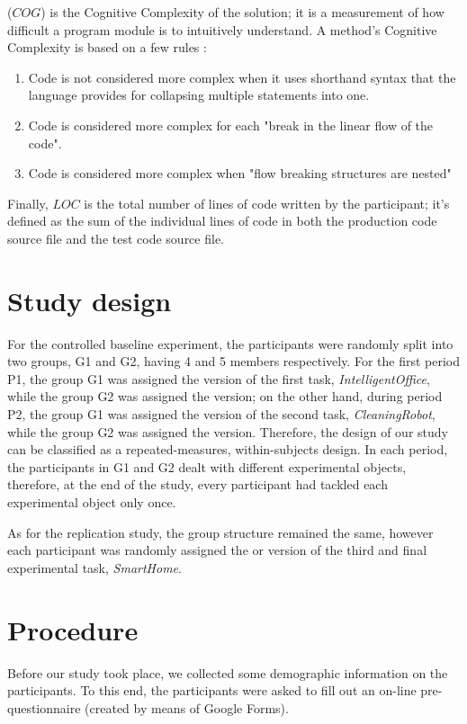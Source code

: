(\textbf{$COG$}) is the Cognitive Complexity of the solution; it is a measurement of how difficult a program module is to intuitively understand. A method's Cognitive Complexity is based on a few rules \cite{CognitiveComplexity}:
\begin{enumerate}
    \item Code is not considered more complex when it uses shorthand syntax that the language provides for collapsing multiple statements into one.
    \item Code is considered more complex for each "break in the linear flow of the code".
    \item Code is considered more complex when "flow breaking structures are nested"
\end{enumerate}

Finally, $LOC$ is the total number of lines of code written by the participant; it's defined as the sum of the individual lines of code in both the production code source file and the test code source file.



\section{Study design}
For the controlled baseline experiment, the participants were randomly split into two groups, G1 and G2, having 4 and 5 members respectively. For the first period P1, the group G1 was assigned the \tdd version of the first task, \textit{IntelligentOffice}, while the group G2 was assigned the \notdd version; on the other hand, during period P2, the group G1 was assigned the \notdd version of the second task, \textit{CleaningRobot}, while the group G2 was assigned the \tdd version.
Therefore, the design of our study can be classified as a repeated-measures, within-subjects design. In each period, the participants in G1 and G2 dealt with different experimental objects, therefore, at the end of the study, every participant had tackled each experimental object only once.

As for the replication study, the group structure remained the same, however each participant was randomly assigned the \tdd or \notdd version of the third and final experimental task, \textit{SmartHome}.


\section{Procedure}
Before our study took place, we collected some demographic information on the participants. To this end, the participants were asked to fill out an on-line pre-questionnaire (created by means of Google Forms).

